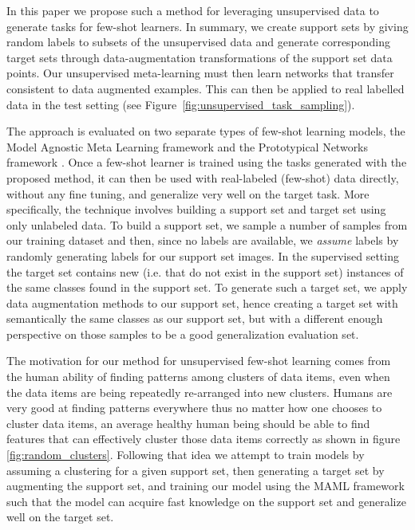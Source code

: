 \documentclass{article}
\begin{document}
In this paper we propose such a method for leveraging unsupervised data to generate tasks for few-shot learners. In summary, we create support sets by giving random labels to subsets of the unsupervised data and generate corresponding target sets through data-augmentation transformations of the support set data points. Our unsupervised meta-learning must then learn networks that transfer consistent to data augmented examples. This can then be applied to real labelled data in the test setting (see Figure~\ref{fig:unsupervised_task_sampling}).

The approach is evaluated on two separate types of few-shot learning models, the Model Agnostic Meta Learning framework \cite{finn2017model} and the Prototypical Networks framework \cite{snell2017prototypical}. Once a few-shot learner is trained using the tasks generated with the proposed method, it can then be used with real-labeled (few-shot) data directly, without any fine tuning, and generalize very well on the target task. More specifically, the technique involves building a support set and target set using only unlabeled data. To build a support set, we sample a number of samples from our training dataset and then, since no labels are available, we \emph{assume} labels by randomly generating labels for our support set images. In the supervised setting the target set contains new (i.e. that do not exist in the support set) instances of the same classes found in the support set. To generate such a target set, we apply data augmentation methods to our support set, hence creating a target set with semantically the same classes as our support set, but with a different enough perspective on those samples to be a good generalization evaluation set.

The motivation for our method for unsupervised few-shot learning comes from the human ability of finding patterns among clusters of data items, even when the data items are being repeatedly re-arranged into new clusters. Humans are very good at finding patterns everywhere thus no matter how one chooses to cluster data items, an average healthy human being should be able to find features that can effectively cluster those data items correctly as shown in figure \ref{fig:random_clusters}. Following that idea we attempt to train models by assuming a clustering for a given support set, then generating a target set by augmenting the support set, and training our model using the MAML framework such that the model can acquire fast knowledge on the support set and generalize well on the target set.
\end{document}
